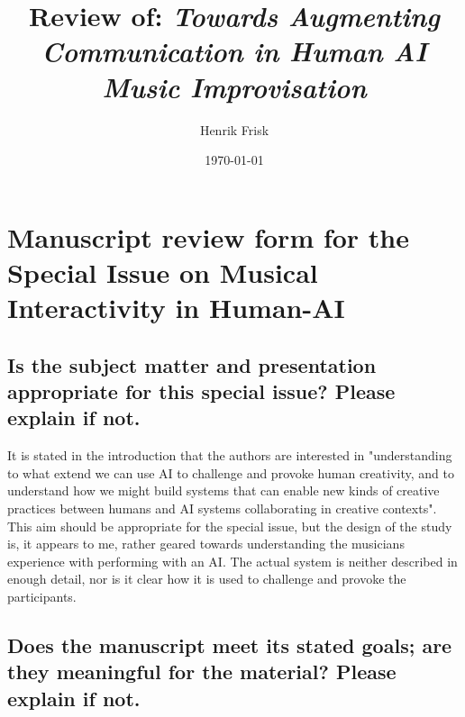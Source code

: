 \documentclass[11pt]{article}
\author{Henrik Frisk}
\date{\today}
\title{Review of: \emph{Towards Augmenting Communication in Human AI Music Improvisation}}
\begin{document}
\maketitle
\allsectionsfont{\sffamily}
\section*{Manuscript review form for the Special Issue on Musical Interactivity in Human-AI}
\label{sec:org28ac135}
\subsection*{Is the subject matter and presentation appropriate for this special issue? Please explain if not.}
\label{sec:org1710e67}
It is stated in the introduction that the authors are interested in "understanding to what extend we can use AI to challenge and provoke human creativity, and to understand how we might build systems that can enable new kinds of creative practices between humans and AI systems collaborating in creative contexts". This aim should be appropriate for the special issue, but the design of the study is, it appears to me, rather geared towards understanding the musicians experience with performing with an AI. The actual system is neither described in enough detail, nor is it clear how it is used to challenge and provoke the participants.

\subsection*{Does the manuscript meet its stated goals; are they meaningful for the material? Please explain if not.}
\label{sec:org1e433b1}
\end{document}
